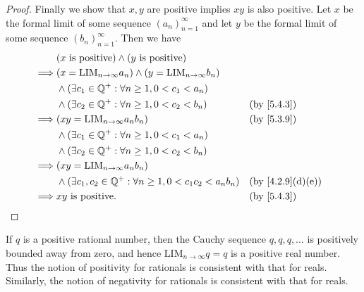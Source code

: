 \begin{proof}
  Finally we show that \(x, y\) are positive implies \(xy\) is also positive.
  Let \(x\) be the formal limit of some sequence \((a_n)_{n = 1}^{\infty}\) and let \(y\) be the formal limit of some sequence \((b_n)_{n = 1}^{\infty}\).
  Then we have
  \begin{align*}
             & (x \text{ is positive}) \land (y \text{ is positive})                                                             \\
    \implies & (x = \text{LIM}_{n \to \infty} a_n) \land (y = \text{LIM}_{n \to \infty} b_n)                                     \\
             & \land (\exists c_1 \in \Q^+ : \forall n \geq 1, 0 < c_1 < a_n)                                                    \\
             & \land (\exists c_2 \in \Q^+ : \forall n \geq 1, 0 < c_2 < b_n)                &  & \by{5.4.3}                     \\
    \implies & (xy = \text{LIM}_{n \to \infty} a_n b_n)                                      &  & \by{5.3.9}                     \\
             & \land (\exists c_1 \in \Q^+ : \forall n \geq 1, 0 < c_1 < a_n)                                                    \\
             & \land (\exists c_2 \in \Q^+ : \forall n \geq 1, 0 < c_2 < b_n)                                                    \\
    \implies & (xy = \text{LIM}_{n \to \infty} a_n b_n)                                                                          \\
             & \land (\exists c_1, c_2 \in \Q^+ : \forall n \geq 1, 0 < c_1 c_2 < a_n b_n)   &  & \text{(by \cref{4.2.9}(d)(e))} \\
    \implies & xy \text{ is positive}.                                                       &  & \by{5.4.3}
  \end{align*}
\end{proof}

\begin{note}
  If \(q\) is a positive rational number, then the Cauchy sequence \(q, q, q, \dots\) is positively bounded away from zero, and hence \(\text{LIM}_{n \to \infty} q = q\) is a positive real number.
  Thus the notion of positivity for rationals is consistent with that for reals.
  Similarly, the notion of negativity for rationals is consistent with that for reals.
\end{note}


